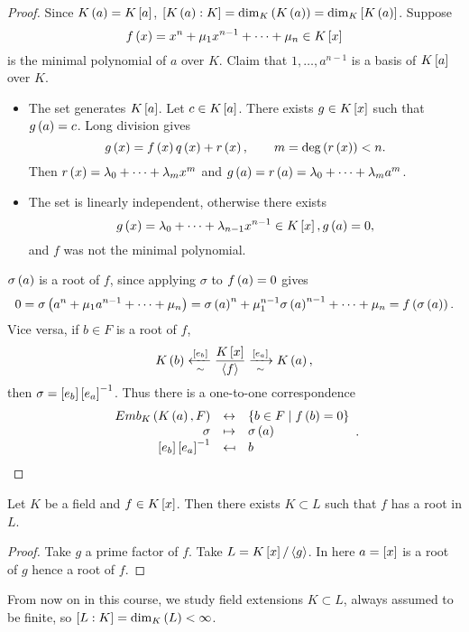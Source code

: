 \begin{proof}
Since $ K\rb{a} = K\sb{a} $, $ \sb{K\rb{a} : K} = \dim_K\rb{K\rb{a}} = \dim_K\sb{K\rb{a}} $. Suppose
$$ f\rb{x} = x^n + \mu_1x^{n - 1} + \dots + \mu_n \in K\sb{x} $$
is the minimal polynomial of $ a $ over $ K $. Claim that $ 1, \dots, a^{n - 1} $ is a basis of $ K\sb{a} $ over $ K $.
\begin{itemize}
\item The set generates $ K\sb{a} $. Let $ c \in K\sb{a} $. There exists $ g \in K\sb{x} $ such that $ g\rb{a} = c $. Long division gives
$$ g\rb{x} = f\rb{x}q\rb{x} + r\rb{x}, \qquad m = \deg\rb{r\rb{x}} < n. $$
Then $ r\rb{x} = \lambda_0 + \dots + \lambda_mx^m $ and $ g\rb{a} = r\rb{a} = \lambda_0 + \dots + \lambda_ma^m $.
\item The set is linearly independent, otherwise there exists
$$ g\rb{x} = \lambda_0 + \dots + \lambda_{n - 1}x^{n- 1} \in K\sb{x}, g\rb{a} = 0, $$
and $ f $ was not the minimal polynomial.
\end{itemize}
$ \sigma\rb{a} $ is a root of $ f $, since applying $ \sigma $ to $ f\rb{a} = 0 $ gives
$$ 0 = \sigma\rb{a^n + \mu_1a^{n - 1} + \dots + \mu_n} = \sigma\rb{a}^n + \mu_1^{n - 1}\sigma\rb{a}^{n - 1} + \dots + \mu_n = f\rb{\sigma\rb{a}}. $$
Vice versa, if $ b \in F $ is a root of $ f $,
$$ K\rb{b} \xleftarrow[\sim]{\sb{e_b}} \dfrac{K\sb{x}}{\ab{f}} \xrightarrow[\sim]{\sb{e_a}} K\rb{a}, $$
then $ \sigma = \sb{e_b}\sb{e_a}^{-1} $. Thus there is a one-to-one correspondence
$$
\begin{array}{rcl}
Emb_K\rb{K\rb{a}, F} & \leftrightarrow & \cb{b \in F \mid f\rb{b} = 0} \\
\sigma & \mapsto & \sigma\rb{a} \\
\sb{e_b}\sb{e_a}^{-1} & \mapsfrom & b
\end{array}.
$$
\end{proof}

\begin{corollary}
Let $ K $ be a field and $ f \in K\sb{x} $. Then there exists $ K \subset L $ such that $ f $ has a root in $ L $.
\end{corollary}

\begin{proof}
Take $ g $ a prime factor of $ f $. Take $ L = K\sb{x} / \ab{g} $. In here $ a = \sb{x} $ is a root of $ g $ hence a root of $ f $.
\end{proof}


From now on in this course, we study field extensions $ K \subset L $, always assumed to be finite, so $ \sb{L : K} = \dim_K\rb{L} < \infty $.

